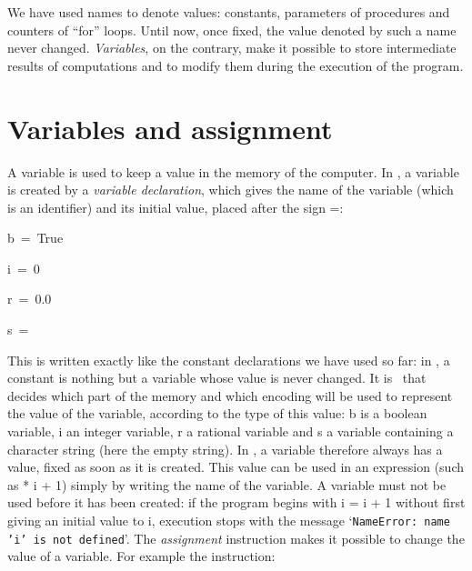 We have used names to denote values: constants, parameters of
procedures and counters of ``for'' loops. Until now, once fixed, the value denoted by such a name
never changed. {\em Variables}, on the contrary, make it possible to store intermediate
results of computations and to modify them during the execution of the program.

\section{Variables and assignment}
A variable is used to keep a value in the memory
of the computer. In \python, a variable is created by a {\em variable
declaration}, which gives the name of the variable (which is an identifier)
and its initial value, placed after the sign {\idt =}:

\vspace{\neglskip}\mbox{\blc  \blk\idt  b\ =\ \mcl True}\par
\vspace{\neglskip}\mbox{\blc  \blk\idt  i\ =\ 0}\par
\vspace{\neglskip}\mbox{\blc  \blk\idt  r\ =\ 0.0}\par
\vspace{\neglskip}\mbox{\blc  \blk\idt  s\ =\ {\cha {}}}\par

\noindent This is written exactly like the constant declarations we have used
so far: in \python, a constant is nothing but a variable whose value is
never changed. It is \python\ that decides which part of the memory and which encoding will be used to
represent the value of the variable, according to the type of this value:
{\idt b} is a boolean variable, {\idt i} an integer variable, {\idt r} a rational
variable and {\idt s} a variable containing a character string (here the empty string). In \python, a variable
therefore always has a value, fixed as soon as it is created. This value can be used in an
expression (such as { * i + 1}) simply by writing the name of the variable.
A variable must not be used before it has been created: if the program begins with
{\idt i = i + 1} without first giving an initial value to {\idt i}, execution stops
with the message `{\tt NameError:\ name 'i' is not defined}'.
The {\em assignment\/} instruction
makes it possible to change the
value of a variable. For example the instruction:

